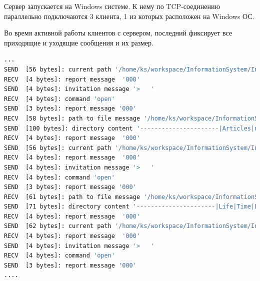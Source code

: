 \documentclass[12pt,a4paper]{report}
\begin{document}
Сервер запускается на Windows системе. К нему по TCP-соединению параллельно подключаются 3 клиента, 1 из которых расположен на Windows ОС.

Во время активной работы клиентов с сервером, последний фиксирует все приходящие и уходящие сообщения и их размер. 
\begin{lstlisting}[language=sh]
...
SEND  [56 bytes]: current path '/home/ks/workspace/InformationSystem/Information System/'
RECV  [4 bytes]: report message  '000'
SEND  [4 bytes]: invitation message '>   '
RECV  [4 bytes]: command 'open'
SEND  [3 bytes]: report message '000'
RECV  [58 bytes]: path to file message '/home/ks/workspace/InformationSystem/Information System/..'
SEND  [100 bytes]: directory content '----------------------|Articles|new.txt|Fairy Tales|first.txt|1.txt|Poems|..|----------------------|'
RECV  [4 bytes]: report message  '000'
SEND  [56 bytes]: current path '/home/ks/workspace/InformationSystem/Information System/'
RECV  [4 bytes]: report message  '000'
SEND  [4 bytes]: invitation message '>   '
RECV  [4 bytes]: command 'open'
SEND  [3 bytes]: report message '000'
RECV  [61 bytes]: path to file message '/home/ks/workspace/InformationSystem/Information System/Poems'
SEND  [71 bytes]: directory content '----------------------|Life|Time|Love|Nature|..|----------------------|'
RECV  [4 bytes]: report message  '000'
SEND  [62 bytes]: current path '/home/ks/workspace/InformationSystem/Information System/Poems/'
RECV  [4 bytes]: report message  '000'
SEND  [4 bytes]: invitation message '>   '
RECV  [4 bytes]: command 'open'
SEND  [3 bytes]: report message '000'
....
\end{lstlisting}
\end{document}
